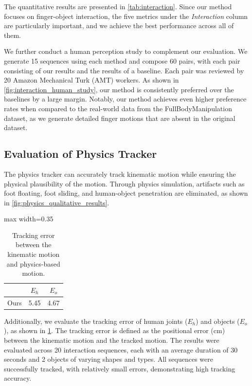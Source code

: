 The quantitative results are presented in \cref{tab:interaction}.
Since our method focuses on finger-object interaction, the five metrics under the \textit{Interaction} column are particularly important, and we achieve the best performance across all of them.

We further conduct a human perception study to complement our evaluation. We generate 15 sequences using each method and compose 60 pairs, with each pair consisting of our results and the results of a baseline. Each pair was reviewed by 20 Amazon Mechanical Turk (AMT) workers. As shown in \cref{fig:interaction_human_study}, our method is consistently preferred over the baselines by a large margin. Notably, our method achieves even higher preference rates when compared to the real-world data from the FullBodyManipulation~\cite{li2023object} dataset, as we generate detailed finger motions that are absent in the original dataset.

\subsection{Evaluation of Physics Tracker}
\label{subsec:phys_eval}

The physics tracker can accurately track kinematic motion while ensuring the physical plausibility of the motion. Through physics simulation, artifacts such as foot floating, foot sliding, and human-object penetration are eliminated, as shown in \cref{fig:physics_qualitative_results}. 

\setlength{\columnsep}{10pt}
\begin{table}
\centering
\vspace{-1pt}
\caption{Tracking error between the kinematic motion and physics-based motion.}
\begin{adjustbox}{max width=0.35\columnwidth}
\begin{tabular}{lcc}
\toprule
& $E_h$ & $E_o$ \\
\midrule
Ours & 5.45 & 4.67 \\
\bottomrule
\end{tabular}
\end{adjustbox}

\label{tab:physics}
\vspace{-6pt}
\end{table}
Additionally, we evaluate the tracking error of human joints ($E_h$) and objects ($E_o$), as shown in \cref{tab:physics}. The tracking error is defined as the positional error (cm) between the kinematic motion and the tracked motion. 
The results were evaluated across 20 interaction sequences, each with an average duration of 30 seconds and 2 objects of varying shapes and types.
All sequences were successfully tracked, with relatively small errors, demonstrating high tracking accuracy.



